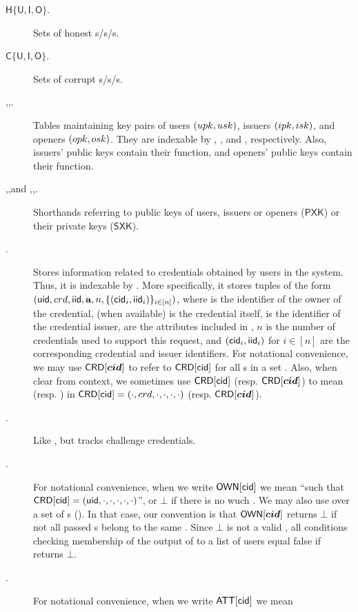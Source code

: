 \begin{description}
\item[$\mathsf{H}\lbrace\mathsf{U},\mathsf{I},\mathsf{O} \rbrace$.] Sets of
  honest {\uid}s/{\iid}s/{\oid}s.
\item[$\mathsf{C}\lbrace\mathsf{U},\mathsf{I},\mathsf{O} \rbrace$.] Sets of
  corrupt {\uid}s/{\iid}s/{\oid}s.
\item[\UK,\IK,\OK.] Tables maintaining key pairs of users $(upk,usk)$, issuers
  $(ipk,isk)$, and openers $(opk,osk)$. They are indexable by \uid,
  \iid, and \oid, respectively. Also, issuers' public keys contain their \fissue
  function, and openers' public keys contain their \finsp function.
\item[\PUBUK,\PUBIK,\PUBOK and \PRVUK,\PRVIK,\PRVOK.] Shorthands referring to
  public keys of users, issuers or openers ($\mathsf{PXK}$) or their private
  keys ($\mathsf{SXK}$).
\item[\CRED.] Stores information related to credentials obtained by users in
  the system. Thus, it is indexable by \cid. More specifically, it stores
  tuples of the form $(\mathsf{uid},crd,\mathsf{iid},\mathbf{a},n,\lbrace (\mathsf{cid}_i,\mathsf{iid}_i)
  \rbrace_{i \in [n]})$, where \uid is the identifier of the owner of the
  credential, \cred (when available) is the credential itself, \iid is the
  identifier of the credential issuer, \attrs are the attributes included in
  \cred, $n$ is the number of credentials used to support this request, and
  $(\mathsf{cid}_i,\mathsf{iid}_i)$ for $i \in [n]$ are the corresponding credential and issuer
  identifiers. For notational convenience, we may use $\mathsf{CRD}[\boldsymbol{cid}]$
  to refer to $\mathsf{CRD}[\mathsf{cid}]$ for all {\cid}s in a set \scid. Also, when clear
  from context, we sometimes use $\mathsf{CRD}[\mathsf{cid}]$ (resp. $\mathsf{CRD}[\boldsymbol{cid}]$) to
  mean \cred (resp. \scred) in $\mathsf{CRD}[\mathsf{cid}] = (\cdot,crd,\cdot,\cdot,
  \cdot,\cdot)$ (resp. $\mathsf{CRD}[\boldsymbol{cid}]$).
\item[\CCRED.] Like \CRED, but tracks challenge credentials.
\item[\OWNR.] For notational convenience, when we write $\mathsf{OWN}[\mathsf{cid}]$ we mean
  ``\uid such that $\mathsf{CRD}[\mathsf{cid}] = (\mathsf{uid},\cdot,\cdot,\cdot,\cdot,\cdot)$'', or
  $\bot$ if there is no wuch \uid. We may also use \OWNR over a set of {\cid}s
  (\scid). In that case, our convention is that $\mathsf{OWN}[\boldsymbol{cid}]$ returns $\bot$ if
  not all passed {\cid}s belong to the same \uid. Since $\bot$ is not a valid
  \uid, all conditions checking membership of the output of \OWNR to a list of
  users equal false if \OWNR returns $\bot$.
\item[\ATTR.] For notational convenience, when we write $\mathsf{ATT}[\mathsf{cid}]$ we mean

\end{description}

